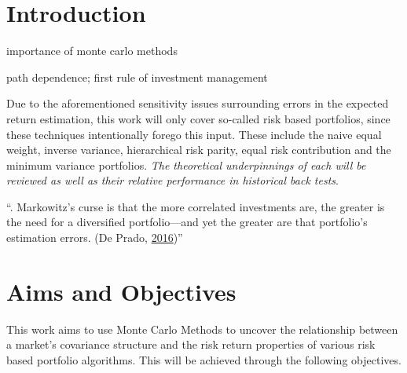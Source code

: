 \documentclass[11pt,preprint, authoryear]{elsarticle}
\numberwithin{equation}{section}
\numberwithin{figure}{section}
\numberwithin{table}{section}
\begin{document}

\headsep 35pt %




\hypertarget{introduction}{%
\section{\texorpdfstring{Introduction
\label{Introduction}}{Introduction }}\label{introduction}}

importance of monte carlo methods

path dependence; first rule of investment management

Due to the aforementioned sensitivity issues surrounding errors in the
expected return estimation, this work will only cover so-called risk
based portfolios, since these techniques intentionally forego this
input. These include the naive equal weight, inverse variance,
hierarchical risk parity, equal risk contribution and the minimum
variance portfolios. \emph{The theoretical underpinnings of each will be
reviewed as well as their relative performance in historical back
tests}.

``. Markowitz's curse is that the more correlated investments are, the
greater is the need for a diversified portfolio---and yet the greater
are that portfolio's estimation errors. (De Prado,
\protect\hyperlink{ref-lopez}{2016})''

\hypertarget{aims-and-objectives}{%
\section{Aims and Objectives}\label{aims-and-objectives}}

This work aims to use Monte Carlo Methods to uncover the relationship
between a market's covariance structure and the risk return properties
of various risk based portfolio algorithms. This will be achieved
through the following objectives.
\end{document}
